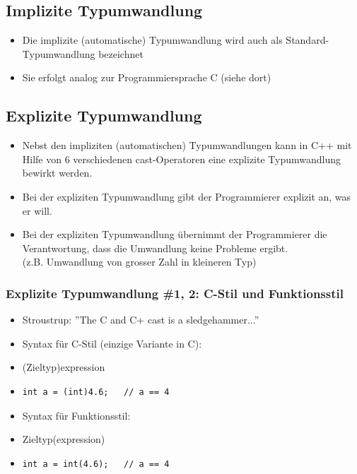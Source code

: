 \subsection{Implizite Typumwandlung}
\label{sec:Implizite Typumwandlung}
\begin{itemize}
	\item Die implizite (automatische) Typumwandlung wird auch als Standard-Typumwandlung bezeichnet
	\item Sie erfolgt analog zur Programmiersprache C (siehe dort)
\end{itemize}

\subsection{Explizite Typumwandlung}
\label{sec:Explizite Typumwandlung}
\begin{itemize}
	\item Nebst den impliziten (automatischen) Typumwandlungen kann in C++ mit Hilfe von 6 verschiedenen cast-Operatoren eine explizite Typumwandlung bewirkt werden.
	\item Bei der expliziten Typumwandlung gibt der Programmierer explizit an, was er will.
	\item[\-]
	\begin{achtung}
	Bei der expliziten Typumwandlung übernimmt der Programmierer die Verantwortung, dass die Umwandlung keine Probleme ergibt.\\
	(z.B. Umwandlung von grosser Zahl in kleineren Typ)
	\end{achtung}
\end{itemize}

\subsubsection{Explizite Typumwandlung \#1, 2: C-Stil und Funktionsstil}
\label{sec:Explizite Typumwandlung 1}
\begin{itemize}
	\item Stroustrup: ''The C and C+ cast is a sledgehammer...''
	\item Syntax für C-Stil (einzige Variante in C):
	\item[\-](Zieltyp)expression
	\item[\-]
\noindent
\begin{minipage}{\linewidth}
\begin{lstlisting}
int a = (int)4.6;	// a == 4
\end{lstlisting}
\end{minipage}
	\item Syntax für Funktionsstil:
	\item[\-] Zieltyp(expression)
	\item[\-]
\noindent
\begin{minipage}{\linewidth}
\begin{lstlisting}
int a = int(4.6);	// a == 4
\end{lstlisting}
\end{minipage}
\end{itemize}

